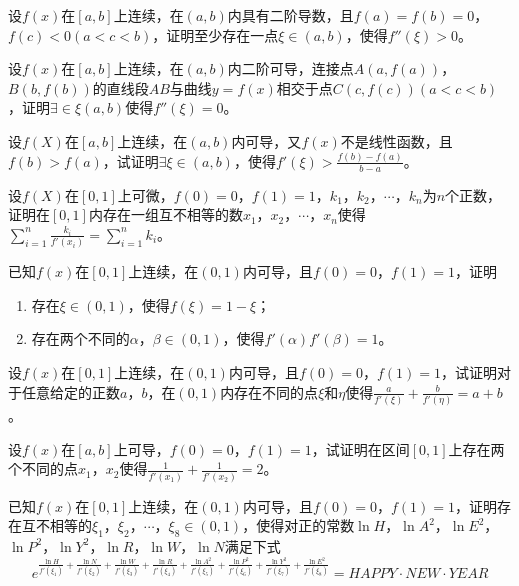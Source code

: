 \begin{example}
	设$f(x)$在$[a,b]$上连续，在$(a,b)$内具有二阶导数，且$f(a)=f(b)=0$，$f(c)<0(a<c<b)$，证明至少存在一点$\xi\in(a,b)$，使得$f''(\xi)>0$。
\end{example}

\begin{example}
	设$f(x)$在$[a,b]$上连续，在$(a,b)$内二阶可导，连接点$A(a,f(a))$，$B(b,f(b))$的直线段$AB$与曲线$y=f(x)$相交于点$C(c,f(c))(a<c<b)$，证明$\exists\in\xi(a,b)$使得$f''(\xi)=0$。
\end{example}

\begin{example}
	设$f(X)$在$[a,b]$上连续，在$(a,b)$内可导，又$f(x)$不是线性函数，且$f(b)>f(a)$，试证明$\exists\xi\in(a,b)$，使得$f'(\xi)>\frac{f(b)-f(a)}{b-a}$。
\end{example}

\begin{example}
	\color{red}设$f(X)$在$[0,1]$上可微，$f(0)=0$，$f(1)=1$，$k_1$，$k_2$，$\cdots$，$k_n$为$n$个正数，证明在$[0,1]$内存在一组互不相等的数$x_1$，$x_2$，$\cdots$，$x_n$使得$\sum_{i=1}^n\frac{k_i}{f'(x_i)}=\sum_{i=1}^nk_i$\color{black}。
\end{example}

\begin{example}
	\color{red}已知$f(x)$在$[0,1]$上连续，在$(0,1)$内可导，且$f(0)=0$，$f(1)=1$，证明
	\begin{enumerate}
		\item 存在$\xi\in(0,1)$，使得$f(\xi)=1-\xi$\color{black}；
		\color{red}\item 存在两个不同的$\alpha$，$\beta\in(0,1)$，使得$f'(\alpha)f'(\beta)=1$\color{black}。
	\end{enumerate}
\end{example}

\begin{example}
	\color{red}设$f(x)$在$[0,1]$上连续，在$(0,1)$内可导，且$f(0)=0$，$f(1)=1$，试证明对于任意给定的正数$a$，$b$，在$(0,1)$内存在不同的点$\xi$和$\eta$使得$\frac{a}{f'(\xi)}+\frac{b}{f'(\eta)}=a+b$\color{black}。
\end{example}

\begin{example}
	设$f(x)$在$[a,b]$上可导，$f(0)=0$，$f(1)=1$，试证明在区间$[0,1]$上存在两个不同的点$x_1$，$x_2$使得$\frac{1}{f'(x_1)}+\frac{1}{f'(x_2)}=2$。
\end{example}

\begin{example}
	已知$f(x)$在$[0,1]$上连续，在$(0,1)$内可导，且$f(0)=0$，$f(1)=1$，证明存在互不相等的$\xi_1$，$\xi_2$，$\cdots$，$\xi_8\in(0,1)$，使得对正的常数$\ln H$，$\ln A^2$，$\ln E^2$，$\ln P^2$，$\ln Y^2$，$\ln R$，$\ln W$，$\ln N$满足下式\[e^{\frac{\ln H}{f'(\xi_1)}+\frac{\ln N}{f'(\xi_2)}+\frac{\ln W}{f'(\xi_3)}+\frac{\ln R}{f'(\xi_4)}+\frac{\ln A^2}{f'(\xi_5)}+\frac{\ln P^2}{f'(\xi_6)}+\frac{\ln Y^2}{f'(\xi_7)}+\frac{\ln E^2}{f'(\xi_8)}}=HAPPY\cdot NEW\cdot YEAR\]
\end{example}

